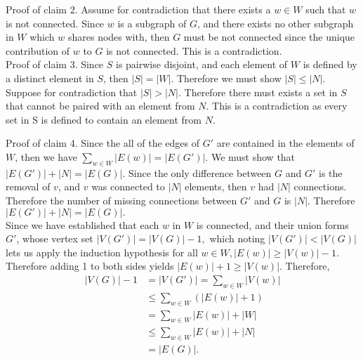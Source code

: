\documentclass[12pt, letterpaper]{article}
\begin{document}
\begin{itemize}
Proof of claim 2.  Assume for contradiction that there exists a $w \in W$ such that $w$ is not connected.  Since $w$ is a subgraph of $G$, and there exists no other subgraph in $W$ which $w$ shares nodes with, then $G$ must be not connected since the unique contribution of $w$ to $G$ is not connected. This is a contradiction. \\


Proof of claim 3.  
	Since $S$ is pairwise disjoint, and each element of $W$ is defined by a distinct element in $S$, then $|S| = |W|.$  Therefore we must show $|S| \leq |N|.$  Suppose for contradiction that $|S| > |N|$.  Therefore there must exists a set in $S$ that cannot be paired with an element from $N$.  This is a contradiction as every set in S is defined to contain an element from $N$.
	
Proof of claim 4.  Since the all of the edges of $G'$ are contained in the elements of $W$, then we have $\sum_{w\in W}|E(w)| = |E(G')|$. We must show that $|E(G')| + |N| = |E(G)|.$  Since the only difference between $G$ and $G'$ is the removal of $v$, and $v$ was connected to $|N|$ elements, then $v$ had $|N|$ connections.  Therefore the number of missing connections between $G'$ and $G$ is $|N|.$  Therefore $|E(G')| + |N| = |E(G)|.$\\

Since we have established that each $w$ in $W$ is connected, and their union forms $G'$, whose vertex set $|V(G')| = |V(G)| -1,$ which noting $|V(G')| < |V(G)|$ lets us apply the induction hypothesis for all $w\in W, |E(w)| \geq |V(w)| - 1.$  Therefore adding 1 to both sides yields $|E(w)| +1 \geq |V(w)|.$  Therefore, \begin{align*}
|V(G)| - 1 &= |V(G')| = \sum_{w\in W} |V(w)| \\
&\leq \sum_{w\in W} (|E(w)| +1) \\
&= \sum_{w\in W}|E(w)| + |W| \\
&\leq \sum_{w\in W}|E(w)| + |N|\\
&= |E(G)|.
\end{align*}


	
\end{itemize}
\end{document}
